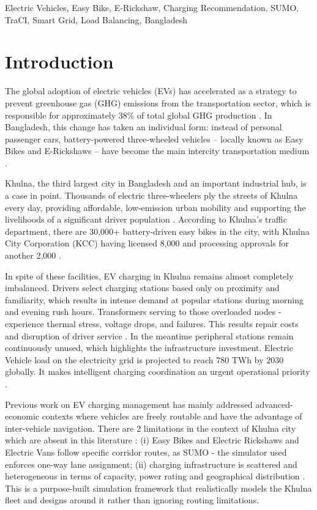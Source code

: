 \documentclass[conference]{IEEEtran}
\begin{document}
\begin{IEEEkeywords}
Electric Vehicles, Easy Bike, E-Rickshaw, Charging Recommendation,
SUMO, TraCI, Smart Grid, Load Balancing, Bangladesh
\end{IEEEkeywords}

\section{Introduction}

The global adoption of electric vehicles (EVs) has accelerated as a
strategy to prevent greenhouse gas (GHG) emissions from the
transportation sector, which is responsible for approximately 38\% of
total global GHG production \cite{b1}. In Bangladesh, this change has
taken an individual form: instead of personal passenger cars,
battery-powered three-wheeled vehicles -- locally known as Easy Bikes
and E-Rickshaws -- have become the main intercity transportation medium \cite{b9}.

Khulna, the third largest city in Bangladesh and an important industrial
hub, is a case in point. Thousands of electric three-wheelers ply the
streets of Khulna every day, providing affordable, low-emission urban
mobility and supporting the livelihoods of a significant driver
population \cite{b2}. According to Khulna's traffic department, there are 30,000+ battery-driven easy bikes in the city, with Khulna City Corporation (KCC) having licensed 8,000 and processing approvals for another 2,000 \cite{b2}.

In spite of these facilities, EV charging in Khulna remains almost
completely imbalanced. Drivers select charging stations based only on
proximity and familiarity, which results in intense demand at popular
stations during morning and evening rush hours. Transformers serving to
those overloaded nodes - experience thermal stress, voltage drops, and
failures. This results repair costs and disruption of driver service \cite{b14}. In
the meantime peripheral stations remain continuously unused, which
highlights the infrastructure investment. Electric Vehicle load on the
electricity grid is projected to reach 780 TWh by 2030 \cite{b3, b4}
globally. It makes intelligent charging coordination an urgent
operational priority \cite{b16}.

Previous work on EV charging management has mainly addressed
advanced-economic contexts where vehicles are freely routable \cite{b5, b6} and have
the advantage of inter-vehicle navigation. There are 2 limitations in
the context of Khulna city which are absent in this literature : (i)
Easy Bikes and Electric Rickshaws and Electric Vans follow specific
corridor routes, as SUMO - the simulator used enforces one-way lane
assignment; (ii) charging infrastructure is scattered and heterogeneous
in terms of capacity, power rating and geographical distribution \cite{b15}. This
is a purpose-built simulation framework that realistically models the
Khulna fleet and designs around it rather than ignoring routing
limitations.
\end{document}
